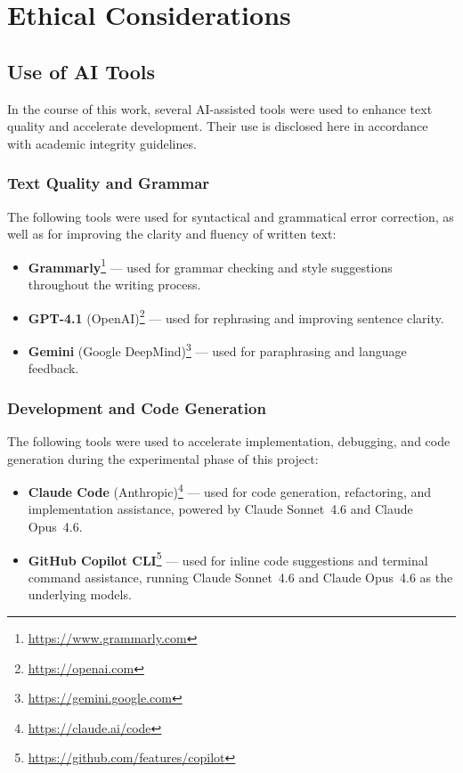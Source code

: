 \chapter{Ethical Considerations}

\section{Use of AI Tools}

In the course of this work, several AI-assisted tools were used to enhance text quality and accelerate development. Their use is disclosed here in accordance with academic integrity guidelines.

\subsection*{Text Quality and Grammar}

The following tools were used for syntactical and grammatical error correction, as well as for improving the clarity and fluency of written text:

\begin{itemize}
    \item \textbf{Grammarly}\footnote{\url{https://www.grammarly.com}} — used for grammar checking and style suggestions throughout the writing process.
    \item \textbf{GPT-4.1} (OpenAI)\footnote{\url{https://openai.com}} — used for rephrasing and improving sentence clarity.
    \item \textbf{Gemini} (Google DeepMind)\footnote{\url{https://gemini.google.com}} — used for paraphrasing and language feedback.
\end{itemize}

\subsection*{Development and Code Generation}

The following tools were used to accelerate implementation, debugging, and code generation during the experimental phase of this project:

\begin{itemize}
    \item \textbf{Claude Code} (Anthropic)\footnote{\url{https://claude.ai/code}} — used for code generation, refactoring, and implementation assistance, powered by Claude Sonnet~4.6 and Claude Opus~4.6.
    \item \textbf{GitHub Copilot CLI}\footnote{\url{https://github.com/features/copilot}} — used for inline code suggestions and terminal command assistance, running Claude Sonnet~4.6 and Claude Opus~4.6 as the underlying models.
\end{itemize}

